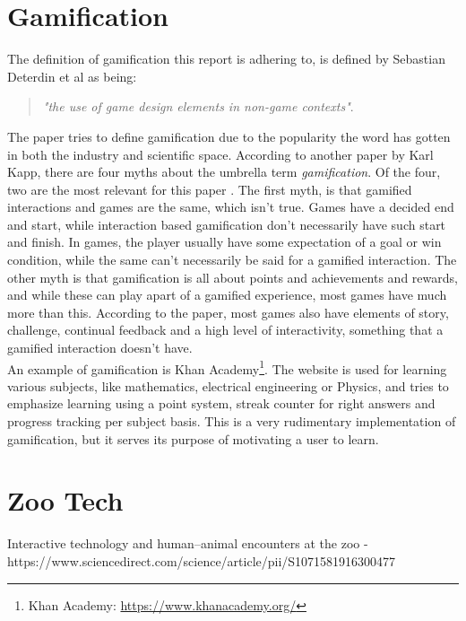 \section{Gamification}
    The definition of gamification this report is adhering to, is defined by Sebastian Deterdin et al as being: \begin{quote}
        \textit{"the use of game design elements in non-game contexts"}\cite{gamification}.
    \end{quote}
    The paper tries to define gamification due to the popularity the word has gotten in both the industry and scientific space\cite{gamification}. According to another paper by Karl Kapp\cite{gamificationMyths}, there are four myths about the umbrella term \textit{gamification}\cite{gamificationMyths}. Of the four, two are the most relevant for this paper . The first myth, is that gamified interactions and games are the same, which isn't true\cite{gamificationMyths}. Games have a decided end and start, while interaction based gamification don't necessarily have such start and finish\cite{gamificationMyths}. In games, the player usually have some expectation of a goal or win condition, while the same can't necessarily be said for a gamified interaction\cite{gamificationMyths}. The other myth is that gamification is all about points and achievements and rewards, and while these can play apart of a gamified experience, most games have much more than this\cite{gamificationMyths}. According to the paper, most games also have elements of story, challenge, continual feedback and a high level of interactivity, something that a gamified interaction doesn't have\cite{gamificationMyths}.\\
    
    An example of gamification is Khan Academy\footnote{Khan Academy: \url{https://www.khanacademy.org/}}. The website is used for learning various subjects, like mathematics, electrical engineering or Physics, and tries to emphasize learning using a point system, streak counter for right answers and progress tracking per subject basis\cite{khanacademyGamfication}. This is a very rudimentary implementation of gamification, but it serves its purpose of motivating a user to learn\cite{khanacademyGamfication}.
    
\section{Zoo Tech}
Interactive technology and human–animal encounters at the zoo - https://www.sciencedirect.com/science/article/pii/S1071581916300477


